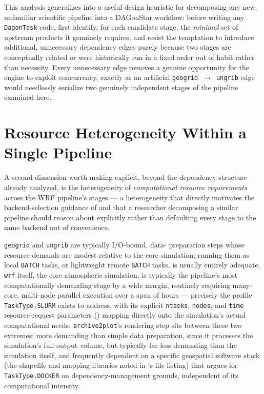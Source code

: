 \begin{practicebox}
This analysis generalizes into a useful design heuristic for decomposing any
new, unfamiliar scientific pipeline into a DAGonStar workflow: before
writing any \texttt{DagonTask} code, first identify, for each candidate
stage, the \emph{minimal} set of upstream products it genuinely requires,
and resist the temptation to introduce additional, unnecessary dependency
edges purely because two stages are conceptually related or were
historically run in a fixed order out of habit rather than necessity. Every
unnecessary edge removes a genuine opportunity for the engine to exploit
concurrency, exactly as an artificial \texttt{geogrid}~$\to$~\texttt{ungrib}
edge would needlessly serialize two genuinely independent stages of the
pipeline examined here.
\end{practicebox}

\section{Resource Heterogeneity Within a Single Pipeline}

A second dimension worth making explicit, beyond the dependency structure
already analyzed, is the heterogeneity of \emph{computational resource
requirements} across the WRF pipeline's stages --- a heterogeneity that
directly motivates the backend-selection guidance of
 and that a researcher decomposing a similar
pipeline should reason about explicitly rather than defaulting every stage
to the same backend out of convenience.

\texttt{geogrid} and \texttt{ungrib} are typically I/O-bound, data-
preparation steps whose resource demands are modest relative to the core
simulation; running them as local \texttt{BATCH} tasks, or lightweight
remote \texttt{BATCH} tasks, is usually entirely adequate. \texttt{wrf}
itself, the core atmospheric simulation, is typically the pipeline's most
computationally demanding stage by a wide margin, routinely requiring
many-core, multi-node parallel execution over a span of hours --- precisely
the profile \texttt{TaskType.SLURM} exists to address, with its explicit
\texttt{ntasks}, \texttt{nodes}, and \texttt{time} resource-request
parameters () mapping directly onto the simulation's
actual computational needs. \texttt{archive2plot}'s rendering step sits
between these two extremes: more demanding than simple data preparation,
since it processes the simulation's full output volume, but typically far
less demanding than the simulation itself, and frequently dependent on a
specific geospatial software stack (the shapefile and mapping libraries
noted in 's file listing) that argues for
\texttt{TaskType.DOCKER} on dependency-management grounds, independent of
its computational intensity.

